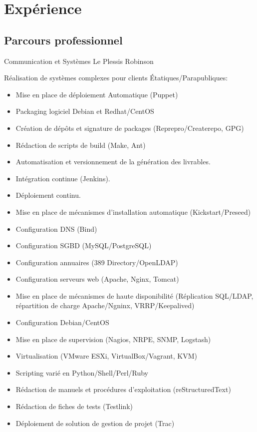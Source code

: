 \documentclass[10pt,a4paper,sans]{moderncv}        %
\begin{document}
\section{Expérience}
\subsection{Parcours professionnel}

              {Communication et Systèmes}
              {Le Plessis Robinson}
              {}
              {Réalisation de systèmes complexes pour clients Étatiques/Parapubliques:
                \begin{itemize}
                \item Mise en place de déploiement Automatique (Puppet)
                \item Packaging logiciel Debian et Redhat/CentOS
                \item Création de dépôts et signature de packages (Reprepro/Createrepo, GPG)
                \item Rédaction de scripts de build (Make, Ant)
                \item Automatisation et versionnement de la génération des livrables.
		\item Intégration continue (Jenkins).
		\item Déploiement continu.
                \item Mise en place de mécanismes d'installation automatique (Kickstart/Preseed)
                \item Configuration DNS (Bind)
                \item Configuration SGBD (MySQL/PostgreSQL)
                \item Configuration annuaires (389 Directory/OpenLDAP)
                \item Configuration serveurs web (Apache, Nginx, Tomcat)
                \item Mise en place de mécanismes de haute disponibilité (Réplication SQL/LDAP, répartition de charge Apache/Ngninx, VRRP/Keepalived)
                \item Configuration Debian/CentOS
                \item Mise en place de supervision (Nagios, NRPE, SNMP, Logstash)
                \item Virtualisation (VMware ESXi, VirtualBox/Vagrant, KVM)
                \item Scripting varié en Python/Shell/Perl/Ruby
                \item Rédaction de manuels et procédures d'exploitation (reStructuredText)
                \item Rédaction de fiches de tests (Testlink)
                \item Déploiement de solution de gestion de projet (Trac)
                \end{itemize}
              }
\newpage
\end{document}
